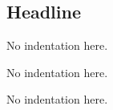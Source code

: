 \documentclass[10pt,halfparskip]{scrartcl}
\begin{document}
 \subsection*{Headline}

No indentation here.

No indentation here.

No indentation here.
\end{document}
